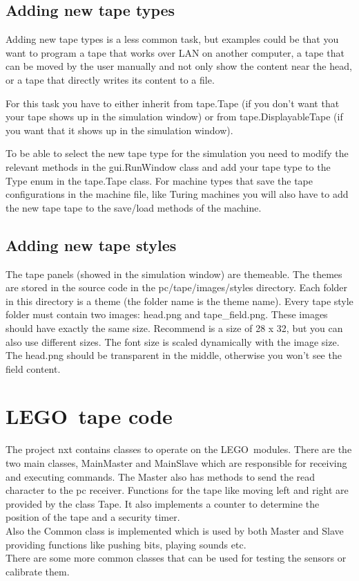 \documentclass[%
  a4paper,%
  11pt,%
  blue,%
  hyperref	%
  ]{tubsartcl}
\begin{document}
\subsection{Adding new tape types}

Adding new tape types is a less common task, but examples could be that you want to program a tape that works over LAN on another computer, a tape that can be moved by the user manually and not only show the content near the head, or a tape that directly writes its content to a file.

For this task you have to either inherit from tape.Tape (if you don't want that your tape shows up in the simulation window) or from tape.DisplayableTape (if you want that it shows up in the simulation window). 

To be able to select the new tape type for the simulation you need to modify the relevant methods in the gui.RunWindow class and add your tape type to the Type enum in the tape.Tape class. For machine types that save the tape configurations in the machine file, like Turing machines you will also have to add the new tape tape to the save/load methods of the machine.

\subsection{Adding new tape styles}
\label{sec:adding-new-tape}

The tape panels (showed in the simulation window) are themeable. The themes are stored in the source code in the pc/tape/images/styles directory. Each folder in this directory is a theme (the folder name is the theme name). Every tape style folder must contain two images: head.png and tape\_field.png. These images should have exactly the same size. Recommend is a size of 28 x 32, but you can also use different sizes. The font size is scaled dynamically with the image size. The head.png should be transparent in the middle, otherwise you won't see the field content.


\section{LEGO\textregistered\, tape code}
\label{sec:lego}

The project nxt contains classes to operate on the LEGO\textregistered\, modules. There are the two main classes, MainMaster and MainSlave which are responsible for receiving and executing commands. The Master also has methods to send the read character to the pc receiver. Functions for the tape like moving left and right are provided by the class Tape. It also implements a counter to determine the position of the tape and a security timer. \\
Also the Common class is implemented which is used by both Master and Slave providing functions like pushing bits, playing sounds etc.\\
There are some more common classes that can be used for testing the sensors or calibrate them.
\end{document}
